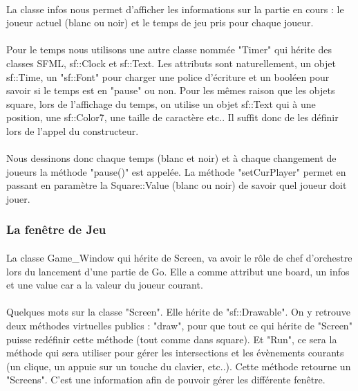                 \paragraph{}La classe infos nous permet d'afficher les informations sur la partie en cours : le joueur actuel (blanc ou noir) et le temps de jeu pris pour chaque joueur. 
                
    	        \paragraph{} Pour le temps nous utilisons une autre classe nommée "Timer" qui hérite des classes SFML, sf::Clock et sf::Text. Les attributs sont naturellement, un objet sf::Time, un "sf::Font" pour charger une police d'écriture et un booléen pour savoir si le temps est en "pause" ou non. Pour les mêmes raison que les objets square, lors de l'affichage du temps, on utilise un objet sf::Text qui à une position, une sf::Color\^7, une taille de caractère etc.. Il suffit donc de les définir lors de l'appel du constructeur.
    	
    	        
    	        \paragraph{} Nous dessinons donc chaque temps (blanc et noir) et à chaque changement de joueurs la méthode "pause()" est appelée. La méthode "setCurPlayer" permet en passant en paramètre la Square::Value (blanc ou noir) de savoir quel joueur doit jouer.
    	        
    	   \subsubsection{La fenêtre de Jeu}
                \paragraph{}La classe Game\_Window qui hérite de Screen, va avoir le rôle de chef d'orchestre lors du lancement d'une partie de Go. Elle a comme attribut une board, un infos et une value car a la valeur du joueur courant.
                
    	        \paragraph{}Quelques mots sur la classe "Screen". Elle hérite de "sf::Drawable". On y retrouve deux méthodes virtuelles publics : "draw", pour que tout ce qui hérite de "Screen" puisse redéfinir cette méthode (tout comme dans square). Et "Run", ce sera la méthode qui sera utiliser pour gérer les intersections et les évènements courants (un clique, un appuie sur un touche du clavier, etc..). Cette méthode retourne un "Screens". C'est une information afin de pouvoir gérer les différente fenêtre.
    	        
